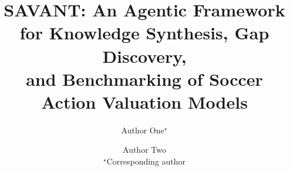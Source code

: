 \documentclass[11pt]{article}
\title{SAVANT: An Agentic Framework for Knowledge Synthesis, Gap Discovery,\\
and Benchmarking of Soccer Action Valuation Models}
\author{%
  Author One$^{\star}$ \and Author Two\\[2pt]
  \small $^{\star}$Corresponding author
}
\date{}
\begin{document}
\maketitle

\begin{abstract}
\end{abstract}












\end{document}
